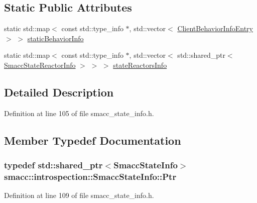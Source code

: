 \subsection*{Static Public Attributes}
\begin{DoxyCompactItemize}
\item 
static std\+::map$<$ const std\+::type\+\_\+info $\ast$, std\+::vector$<$ \hyperlink{structsmacc_1_1introspection_1_1ClientBehaviorInfoEntry}{Client\+Behavior\+Info\+Entry} $>$ $>$ \hyperlink{classsmacc_1_1introspection_1_1SmaccStateInfo_ad3d8b3450060cb0b91f38fb2fe0a7678}{static\+Behavior\+Info}
\item 
static std\+::map$<$ const std\+::type\+\_\+info $\ast$, std\+::vector$<$ std\+::shared\+\_\+ptr$<$ \hyperlink{structsmacc_1_1introspection_1_1SmaccStateReactorInfo}{Smacc\+State\+Reactor\+Info} $>$ $>$ $>$ \hyperlink{classsmacc_1_1introspection_1_1SmaccStateInfo_abd1d6ca5060c87f6bd11fde3e5b2ac4d}{state\+Reactors\+Info}
\end{DoxyCompactItemize}


\subsection{Detailed Description}


Definition at line 105 of file smacc\+\_\+state\+\_\+info.\+h.



\subsection{Member Typedef Documentation}
\subsubsection[{\texorpdfstring{Ptr}{Ptr}}]{\setlength{\rightskip}{0pt plus 5cm}typedef std\+::shared\+\_\+ptr$<${\bf Smacc\+State\+Info}$>$ {\bf smacc\+::introspection\+::\+Smacc\+State\+Info\+::\+Ptr}}\hypertarget{classsmacc_1_1introspection_1_1SmaccStateInfo_a374ef2022bca958ab14469931fc4dcc1}{}\label{classsmacc_1_1introspection_1_1SmaccStateInfo_a374ef2022bca958ab14469931fc4dcc1}


Definition at line 109 of file smacc\+\_\+state\+\_\+info.\+h.



